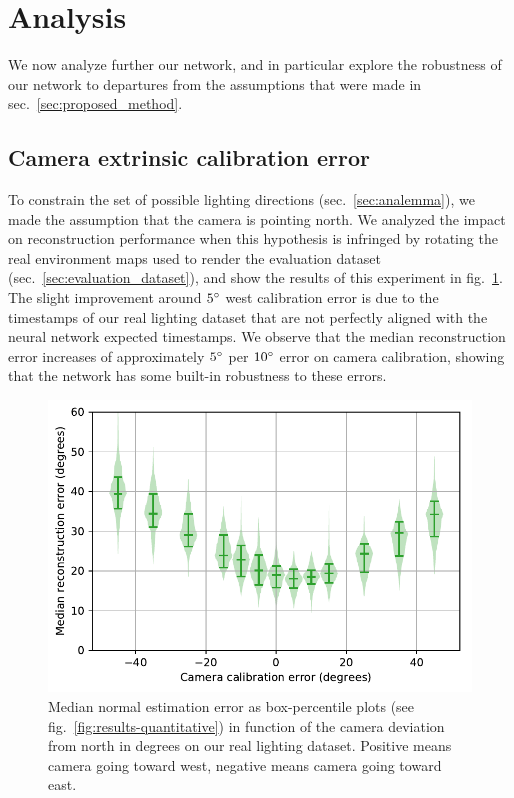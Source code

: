 \section{Analysis}
\label{sec:analysis}

We now analyze further our network, and in particular explore the robustness of our network to departures from the assumptions that were made in sec.~\ref{sec:proposed_method}. 

\subsection{Camera extrinsic calibration error}

To constrain the set of possible lighting directions (sec.~\ref{sec:analemma}), we made the assumption that the camera is pointing north. We analyzed the impact on reconstruction performance when this hypothesis is infringed by rotating the real environment maps used to render the evaluation dataset (sec.~\ref{sec:evaluation_dataset}), and show the results of this experiment in fig.~\ref{fig:calibration_error_performance}. The slight improvement around $5^{\circ}$ west calibration error is due to the timestamps of our real lighting dataset that are not perfectly aligned with the neural network expected timestamps. We observe that the median reconstruction error increases of approximately $5^{\circ}$ per $10^{\circ}$ error on camera calibration, showing that the network has some built-in robustness to these errors. 


\begin{figure}[!t]
\centering
\includegraphics[width=0.7\linewidth]{figures/analysis/performance_calibration_error.pdf}
\caption[Surface reconstruction performance in function of camera calibration error]{Median normal estimation error as box-percentile plots (see fig.~\ref{fig:results-quantitative}) in function of the camera deviation from north in degrees on our real lighting dataset. Positive means camera going toward west, negative means camera going toward east. }
\label{fig:calibration_error_performance}
\end{figure}


